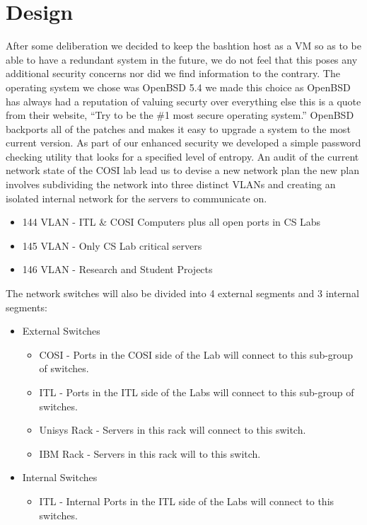 \documentclass[11pt]{article}
\begin{document}
\section{Design}
\begin{paragraph}\indent
After some deliberation we decided to keep the bashtion host as a VM so as to be able to have a redundant system in the future, we do not feel that this poses any additional security concerns nor did we find information to the contrary. 
The operating system we chose was OpenBSD 5.4 we made this choice as OpenBSD has always had a reputation of valuing securty over everything else this is a quote from their website, ``Try to be the \#1 most secure operating system.'' 
OpenBSD backports all of the patches and makes it easy to upgrade a system to the most current version.
As part of our enhanced security we developed a simple password checking utility that looks for a specified level of entropy.
An audit of the current network state  of the COSI lab lead us to devise a new network plan the new plan involves subdividing the network into three distinct VLANs and creating an isolated internal network for the servers to communicate on.
\begin{itemize}
	\item 144 VLAN - ITL \& COSI Computers plus all open ports in CS Labs
	\item 145 VLAN - Only CS Lab critical servers
	\item 146 VLAN - Research and Student Projects
\end{itemize}
The network switches will also be divided into 4 external segments and 3 internal segments:
\begin{itemize}
	\item External Switches
	\begin{itemize}
		\item COSI - Ports in the COSI side of the Lab will connect to this sub-group of switches.
		\item ITL  - Ports in the ITL side of the Labs will connect to this sub-group of switches.
		\item Unisys Rack - Servers in this rack will connect to this switch.
		\item IBM Rack - Servers in this rack will to this switch.
	\end{itemize}
	\item Internal Switches
	\begin{itemize}
		\item ITL  - Internal Ports in the ITL side of the Labs will connect to this switches.

\end{itemize}
\end{itemize}
\end{paragraph}
\end{document}
